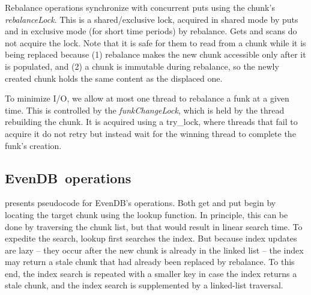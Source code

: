 \documentclass[sigplan,10pt]{acmart}
\newcommand{\code}[1]{\textsf{\fontsize{9}{11}\selectfont #1}}
\newcommand{\sys}{EvenDB}
\begin{document}
Rebalance operations synchronize with concurrent puts using the chunk's \emph{rebalanceLock}.
This is a shared/exclusive lock, acquired in shared mode by puts and in exclusive mode (for short time periods)
by rebalance. 
Gets and scans do not acquire the lock. Note that it is safe for them to read from a chunk while it is being replaced because
(1) rebalance makes the new chunk accessible only after it is populated, and (2) a chunk is immutable during rebalance, so 
the newly created chunk holds the same content as the displaced one.

To minimize I/O, we allow at most one thread to rebalance a funk at a given time. This is controlled by 
the  \emph{funkChangeLock}, which is held by the thread rebuilding the  chunk. 
It is acquired using a try\_lock, where threads that fail to acquire it do not retry but instead wait for the winning thread to complete the funk's creation.

\subsection{\sys\ operations}
\label{ssec:ops}

  presents pseudocode for \sys's operations. 
Both get and put begin by locating the target chunk using the \code{lookup} function. In principle, this can be done by traversing the chunk list, but that would result in linear search time. To expedite the search,   \code{lookup} first searches the index. But because index updates are lazy -- they occur after the new chunk is already
in the linked list --  the index may return a stale chunk that had already been replaced by rebalance. To this end, the index search is repeated with a smaller key in case the index returns a stale chunk, and the index search is supplemented by a linked-list traversal. 
\end{document}
